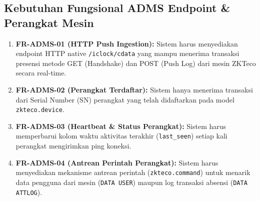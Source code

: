 \documentclass[12pt,a4paper]{article}
\begin{document}
\begin{center}
\end{center}
\vspace{0.5cm}

\subsection{Kebutuhan Fungsional ADMS Endpoint \& Perangkat Mesin}
\begin{enumerate}
    \item \textbf{FR-ADMS-01 (HTTP Push Ingestion):} Sistem harus menyediakan endpoint HTTP native \texttt{/iclock/cdata} yang mampu menerima transaksi presensi metode GET (Handshake) dan POST (Push Log) dari mesin ZKTeco secara real-time.
    \item \textbf{FR-ADMS-02 (Perangkat Terdaftar):} Sistem hanya menerima transaksi dari Serial Number (SN) perangkat yang telah didaftarkan pada model \texttt{zkteco.device}.
    \item \textbf{FR-ADMS-03 (Heartbeat \& Status Perangkat):} Sistem harus memperbarui kolom waktu aktivitas terakhir (\texttt{last\_seen}) setiap kali perangkat mengirimkan ping koneksi.
    \item \textbf{FR-ADMS-04 (Antrean Perintah Perangkat):} Sistem harus menyediakan mekanisme antrean perintah (\texttt{zkteco.command}) untuk menarik data pengguna dari mesin (\texttt{DATA USER}) maupun log transaksi absensi (\texttt{DATA ATTLOG}).
\end{enumerate}
\end{document}
